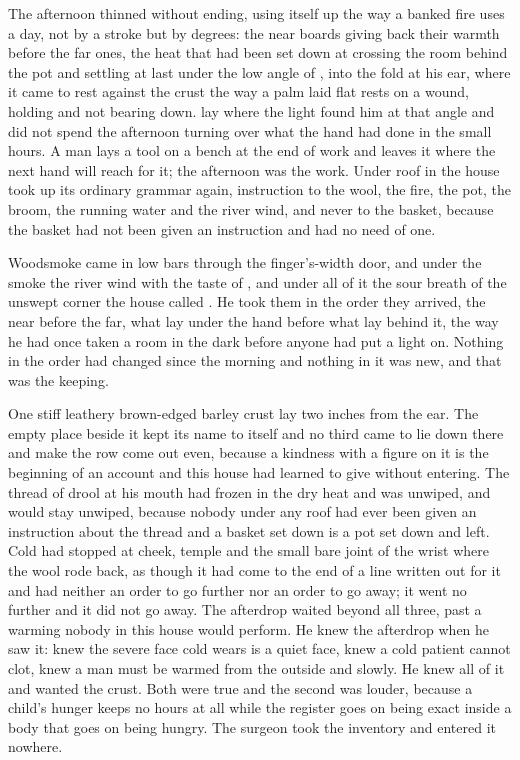 The afternoon thinned without ending, using itself up the way a banked fire uses a day, not by a stroke but by degrees: the near boards giving back their warmth before the far ones, the heat that had been set down at  crossing the room behind the pot and settling at last under the low angle of , into the fold at his ear, where it came to rest against the crust the way a palm laid flat rests on a wound, holding and not bearing down.  lay where the light found him at that angle and did not spend the afternoon turning over what the hand had done in the small hours. A man lays a tool on a bench at the end of work and leaves it where the next hand will reach for it; the afternoon was the work. Under  roof in  the house took up its ordinary grammar again, instruction to the wool, the fire, the pot, the broom, the running water and the river wind, and never to the basket, because the basket had not been given an instruction and had no need of one.

Woodsmoke came in low bars through the finger's-width door, and under the smoke the river wind with the taste of , and under all of it the sour breath of the unswept corner the house called . He took them in the order they arrived, the near before the far, what lay under the hand before what lay behind it, the way he had once taken a room in the dark before anyone had put a light on. Nothing in the order had changed since the morning and nothing in it was new, and that was the keeping.

One stiff leathery brown-edged barley crust lay two inches from the ear. The empty place beside it kept its name to itself and no third came to lie down there and make the row come out even, because a kindness with a figure on it is the beginning of an account and this house had learned to give without entering. The thread of drool at his mouth had frozen in the dry heat and was unwiped, and would stay unwiped, because nobody under any roof had ever been given an instruction about the thread and a basket set down is a pot set down and left. Cold had stopped at cheek, temple and the small bare joint of the wrist where the wool rode back, as though it had come to the end of a line written out for it and had neither an order to go further nor an order to go away; it went no further and it did not go away. The afterdrop waited beyond all three, past a warming nobody in this house would perform. He knew the afterdrop when he saw it: knew the severe face cold wears is a quiet face, knew a cold patient cannot clot, knew a man must be warmed from the outside and slowly. He knew all of it and wanted the crust. Both were true and the second was louder, because a child's hunger keeps no hours at all while the register goes on being exact inside a body that goes on being hungry. The surgeon took the inventory and entered it nowhere.

